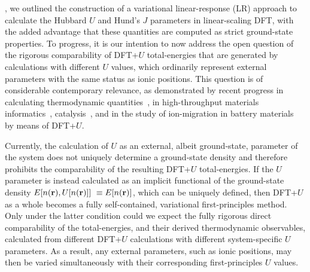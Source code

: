 

, 
we outlined the construction of a variational linear-response (LR) approach 
to calculate the Hubbard $U$ and Hund's $J$ parameters 
in linear-scaling DFT, 
with the added advantage that these quantities 
are computed as strict ground-state properties.
%
%
To progress, 
it is our intention to now address the open question of 
the rigorous comparability of 
DFT+$U$ total-energies that are
generated by calculations with different $U$ values, 
which ordinarily represent external parameters
with the same status as ionic positions.
%
This question is of considerable contemporary relevance, 
as demonstrated by recent progress in calculating  
thermodynamic quantities~\cite{PhysRevB.75.035109,PhysRevB.78.075125,PhysRevB.75.035115,1674-1056-17-4-035,doi:10.1021/cm702327g,CapdevilaCortada201558,PhysRevB.85.155208,PhysRevB.84.045115,PhysRevB.85.115104,PhysRevB.90.115105},
in high-throughput materials informatics~\cite{jain2011high,setyawan2010high,curtarolo,Curtarolo2012218,PhysRevX.5.011006}, 
 catalysis~\cite{Bliem1215,C1CP22128K,doi:10.1021/jp407736f,doi:10.1021/acscatal.6b01907,PhysRevB.88.245204},
and in the study of ion-migration in battery materials~\cite{PhysRevB.70.235121,PhysRevB.83.075112,PhysRevB.93.085135,C2TA00839D,C1EE01782A,Zhou2004181,doi:10.1021/jacs.5b04690,doi:10.1021/acs.chemmater.5b03554,Morgan20075034} 
by means of DFT+$U$.

Currently, 
the calculation of $U$ as an external, 
{albeit ground-state}, parameter 
of the system does not uniquely determine 
a ground-state density and therefore prohibits  
the comparability of the resulting DFT+$U$ total-energies.
%
If the $U$  parameter is instead calculated 
as an implicit functional of the ground-state density
$E[n(\br),U[n(\br)]]\ \equiv E[n(\br)]$, 
%
which can be uniquely defined, 
then DFT+$U$ {as a whole} becomes a 
fully self-contained, variational first-principles method. 
%
Only under the latter condition could we expect the 
fully rigorous direct comparability of the total-energies, 
and their derived thermodynamic observables,  
calculated from different DFT+$U$ calculations 
with different system-specific $U$ parameters.
As a result, any external parameters, 
such as ionic positions, 
may then be varied simultaneously with their 
corresponding first-principles $U$ values.

